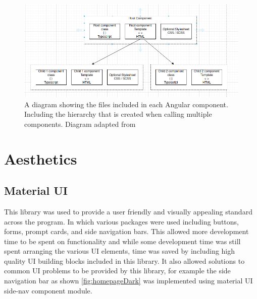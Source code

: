 \documentclass{l4proj}
\begin{document}
\begin{figure}
    \centering
    \includegraphics[width=1\linewidth]{images/componentDesign.png}
    \caption{A diagram showing the files included in each Angular component. Including the hierarchy that is created when calling multiple components. Diagram adapted from \cite{noauthor_angular_nodate-2}}
    \label{fig:angularComp}
\end{figure}


\section{Aesthetics}
\subsection{Material UI}
This library was used to provide a user friendly and visually appealing standard across the program. In which various packages were used including buttons, forms, prompt cards, and side navigation bars. This allowed more development time to be spent on functionality and while some development time was still spent arranging the various UI elements, time was saved by including high quality UI building blocks included in this library. It also allowed solutions to common UI problems to be provided by this library, for example the side navigation bar as shown \ref{fig:homepageDark} was implemented using material UI side-nav component module.

\end{document}
